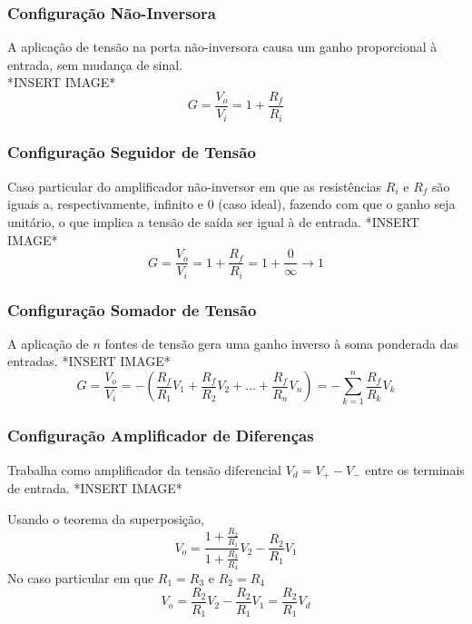 \documentclass{article}
\numberwithin{equation}{section}
\begin{document}
    \subsubsection{Configuração Não-Inversora}
    A aplicação de tensão na porta não-inversora causa um ganho proporcional à entrada, sem mudança de sinal. \\
    *INSERT IMAGE*
    \begin{equation}
        G=\frac{V_{o}}{V_{i}}=1+\frac{R_{f}}{R_{i}}
    \end{equation}

    \subsubsection{Configuração Seguidor de Tensão}
    Caso particular do amplificador não-inversor em que as resistências $R_{i}$ e $R_{f}$ são iguais a, respectivamente, infinito e $0$ (caso ideal), fazendo com que o ganho seja unitário, o que implica a tensão de saída ser igual à de entrada.
    *INSERT IMAGE*
    \begin{equation}
        G=\frac{V_{o}}{V_{i}}=1+\frac{R_{f}}{R_{i}}=1+\frac{0}{\infty}\xrightarrow{}1
    \end{equation}

    \subsubsection{Configuração Somador de Tensão}
    A aplicação de $n$ fontes de tensão gera uma ganho inverso à soma ponderada das entradas.
    *INSERT IMAGE*
    \begin{equation}
        G=\frac{V_{o}}{V_{i}}=-(\frac{R_{f}}{R_{1}}V_{1}+\frac{R_{f}}{R_{2}}V_{2}+...+\frac{R_{f}}{R_{n}}V_{n})=-\sum_{k=1}^{n}\frac{R_{f}}{R_{k}}V_{k}
    \end{equation}

    \subsubsection{Configuração Amplificador de Diferenças}
    Trabalha como amplificador da tensão diferencial $V_{d}=V_{+}-V_{-}$ entre os terminais de entrada. %
    *INSERT IMAGE*

    Usando o teorema da superposição,
    \begin{equation*}
        V_{o}=\frac{1+\displaystyle\frac{R_{2}}{R_{1}}}{1+\displaystyle\frac{R_{3}}{R_{4}}}V_{2} - \displaystyle\frac{R_{2}}{R_{1}}V_{1}
    \end{equation*}
    No caso particular em que $R_{1}=R_{3}$ e $R_{2}=R_{4}$
    \begin{equation}
        V_{o}=\frac{R_{2}}{R_{1}}V_{2}-\frac{R_{2}}{R_{1}}V_{1}=\frac{R_{2}}{R_{1}}V_{d}
    \end{equation}
\end{document}
